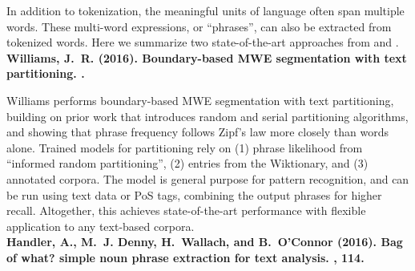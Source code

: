 In addition to tokenization,
the meaningful units of language often span multiple words.
These multi-word expressions,
or ``phrases'',
can also be extracted from tokenized words.
Here we summarize two state-of-the-art approaches from \cite{handler2016bag} and \cite{williams2016boundary}.\\

\noindent \textbf{Williams, J.~R. (2016).
\newblock Boundary-based MWE segmentation with text partitioning.
.}

\noindent Williams performs boundary-based MWE segmentation with text partitioning,
building on prior work that introduces random and serial partitioning algorithms,
and showing that phrase frequency follows Zipf's law more closely than words alone. 
Trained models for partitioning rely on (1) phrase likelihood from ``informed random partitioning'', (2) entries from the Wiktionary, and (3) annotated corpora.
The model is general purpose for pattern recognition,
and can be run using text data or PoS tags,
combining the output phrases for higher recall.
Altogether, this achieves state-of-the-art performance with flexible application to any text-based corpora.\\

\noindent \textbf{Handler, A., M.~J. Denny, H.~Wallach, and B.~O'Connor (2016).
\newblock Bag of what? simple noun phrase extraction for text analysis.
, 114.}

